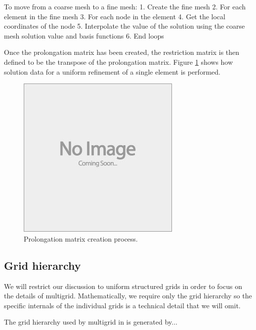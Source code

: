 To move from a coarse mesh to a fine mesh:
1. Create the fine mesh
2. For each element in the fine mesh
3. For each node in the element
4. Get the local coordinates of the node
5. Interpolate the value of the solution using the coarse mesh solution value and basis functions
6. End loops

Once the prolongation matrix has been created, the restriction matrix is then defined to be the transpose of the prolongation matrix.
Figure \ref{fig:create_prolong_matrix} shows how solution data for a uniform refinement of a single element is performed.

\begin{figure}[h]
	\centering
	\includegraphics[draft]{images/placeholder}
	\caption{Prolongation matrix creation process. \label{fig:create_prolong_matrix}}
\end{figure}




\subsection{Grid hierarchy}

We will restrict our discussion to uniform structured grids in order to focus on the details of multigrid.
Mathematically, we require only the grid hierarchy so the specific internals of the individual grids is a technical detail that we will omit. 

The grid hierarchy used by multigrid in \oomph is generated by... 



